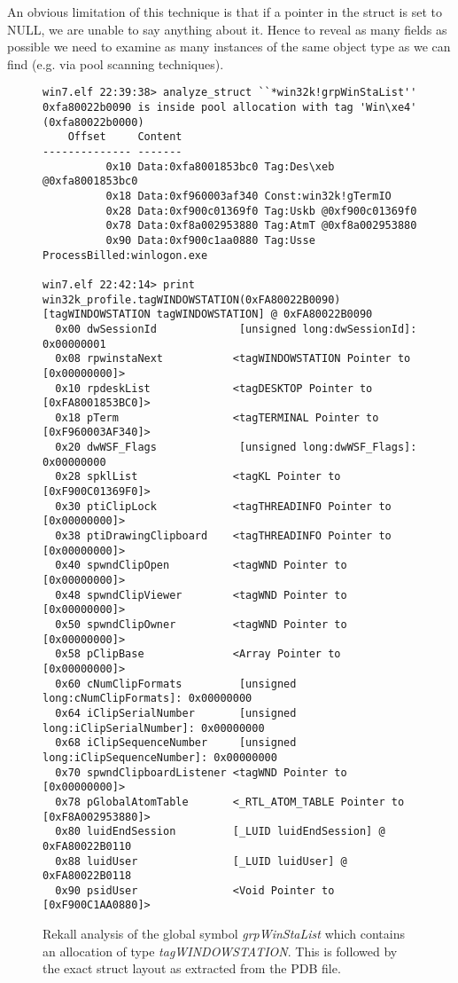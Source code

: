 An obvious limitation of this technique is that if a pointer in the struct is
set to NULL, we are unable to say anything about it. Hence to reveal as many
fields as possible we need to examine as many instances of the same object type
as we can find (e.g. via pool scanning techniques).

\begin{figure}
\label{analyze_structs}
\begin{lstlisting}[basicstyle=\tiny\ttfamily, frame=single, linewidth=\columnwidth]
win7.elf 22:39:38> analyze_struct ``*win32k!grpWinStaList''
0xfa80022b0090 is inside pool allocation with tag 'Win\xe4' (0xfa80022b0000)
    Offset     Content
-------------- -------
          0x10 Data:0xfa8001853bc0 Tag:Des\xeb @0xfa8001853bc0
          0x18 Data:0xf960003af340 Const:win32k!gTermIO
          0x28 Data:0xf900c01369f0 Tag:Uskb @0xf900c01369f0
          0x78 Data:0xf8a002953880 Tag:AtmT @0xf8a002953880
          0x90 Data:0xf900c1aa0880 Tag:Usse ProcessBilled:winlogon.exe

win7.elf 22:42:14> print win32k_profile.tagWINDOWSTATION(0xFA80022B0090)
[tagWINDOWSTATION tagWINDOWSTATION] @ 0xFA80022B0090
  0x00 dwSessionId             [unsigned long:dwSessionId]: 0x00000001
  0x08 rpwinstaNext           <tagWINDOWSTATION Pointer to [0x00000000]>
  0x10 rpdeskList             <tagDESKTOP Pointer to [0xFA8001853BC0]>
  0x18 pTerm                  <tagTERMINAL Pointer to [0xF960003AF340]>
  0x20 dwWSF_Flags             [unsigned long:dwWSF_Flags]: 0x00000000
  0x28 spklList               <tagKL Pointer to [0xF900C01369F0]>
  0x30 ptiClipLock            <tagTHREADINFO Pointer to [0x00000000]>
  0x38 ptiDrawingClipboard    <tagTHREADINFO Pointer to [0x00000000]>
  0x40 spwndClipOpen          <tagWND Pointer to [0x00000000]>
  0x48 spwndClipViewer        <tagWND Pointer to [0x00000000]>
  0x50 spwndClipOwner         <tagWND Pointer to [0x00000000]>
  0x58 pClipBase              <Array Pointer to [0x00000000]>
  0x60 cNumClipFormats         [unsigned long:cNumClipFormats]: 0x00000000
  0x64 iClipSerialNumber       [unsigned long:iClipSerialNumber]: 0x00000000
  0x68 iClipSequenceNumber     [unsigned long:iClipSequenceNumber]: 0x00000000
  0x70 spwndClipboardListener <tagWND Pointer to [0x00000000]>
  0x78 pGlobalAtomTable       <_RTL_ATOM_TABLE Pointer to [0xF8A002953880]>
  0x80 luidEndSession         [_LUID luidEndSession] @ 0xFA80022B0110
  0x88 luidUser               [_LUID luidUser] @ 0xFA80022B0118
  0x90 psidUser               <Void Pointer to [0xF900C1AA0880]>

\end{lstlisting}
\caption{Rekall analysis of the global symbol {\em grpWinStaList} which contains
  an allocation of type {\em tagWINDOWSTATION}. This is followed by the exact
  struct layout as extracted from the PDB file.  }
\end{figure}

